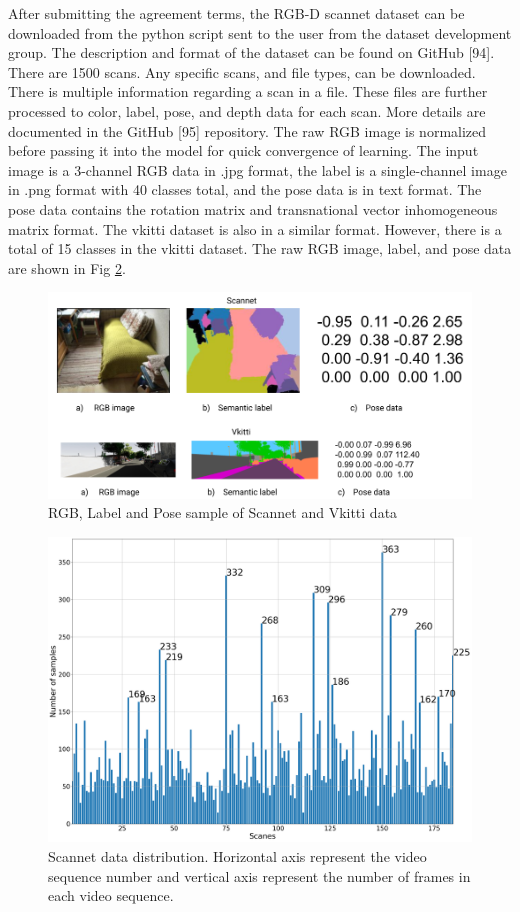 	After submitting the agreement terms, the RGB-D scannet dataset can be downloaded from the python script sent to the user from the dataset development group. The description and format of the dataset can be found on GitHub [94]. There are 1500 scans. Any specific scans, and file types,  can be downloaded. There is multiple information regarding a scan in a file. These files are further processed to color, label, pose, and depth data for each scan. More details are documented in the GitHub [95] repository. The raw RGB image is normalized before passing it into the model for quick convergence of learning. The input image is a 3-channel RGB data in .jpg format, the label is a single-channel image in .png format with 40 classes total, and the pose data is in text format. The pose data contains the rotation matrix and transnational vector inhomogeneous matrix format. The vkitti dataset is also in a similar format. However, there is a total of 15 classes in the vkitti dataset. The raw RGB image, label, and pose data are shown in Fig \ref{fig:scannet_vkitti}. 

	\begin{figure}
		\centering
		\includegraphics[width=14cm]{images/scannet_vkitti_data.png}
		\caption{RGB, Label and Pose sample of Scannet and Vkitti data}
		\label{fig:scannet_vkitti}
	\end{figure}	

	\begin{figure}
		\centering
		\includegraphics[width=14cm]{images/scannet_scanes_samples.png}
		\caption{Scannet data distribution. Horizontal axis represent the video sequence number and vertical axis represent the number of frames in each video sequence.}
		\label{fig:scannet_vkitti}
	\end{figure}

